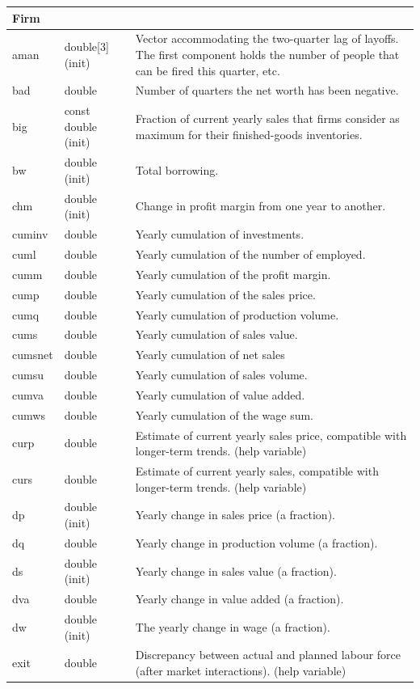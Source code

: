 \documentclass{article}
\begin{document}
\begin{longtable}{p{}p{}p{}}
\multicolumn{3}{l}{\textbf{Firm}} \\
\midrule
aman & double[3] (init) & Vector accommodating the two-quarter lag of layoffs. The first component holds the number of people that can be fired this quarter, etc.\\
bad & double & Number of quarters the net worth has been negative.\\
big & const double (init) & Fraction of current yearly sales that firms consider as maximum for their finished-goods inventories.\\
bw & double (init) & Total borrowing.\\
chm & double (init) & Change in profit margin from one year to another.\\
cuminv & double & Yearly cumulation of investments.\\
cuml & double & Yearly cumulation of the number of employed.\\
cumm & double & Yearly cumulation of the profit margin.\\
cump & double & Yearly cumulation of the sales price.\\
cumq & double & Yearly cumulation of production volume.\\
cums & double & Yearly cumulation of sales value.\\
cumsnet & double & Yearly cumulation of net sales\\
cumsu & double & Yearly cumulation of sales volume.\\
cumva & double & Yearly cumulation of value added.\\
cumws & double & Yearly cumulation of the wage sum.\\
curp & double & Estimate of current yearly sales price, compatible with longer-term trends. (help variable)\\
curs & double & Estimate of current yearly sales, compatible with longer-term trends. (help variable)\\
dp & double (init) & Yearly change in sales price (a fraction).\\
dq & double & Yearly change in production volume (a fraction).\\
ds & double (init) & Yearly change in sales value (a fraction).\\
dva & double & Yearly change in value added (a fraction).\\
dw & double (init) & The yearly change in wage (a fraction).\\
exit & double & Discrepancy between actual and planned labour force (after market interactions). (help variable)\\

\end{longtable}
\end{document}
